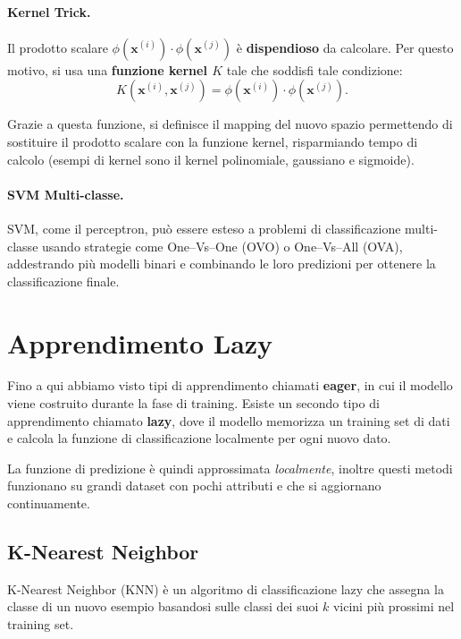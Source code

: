 \paragraph{Kernel Trick.} Il prodotto scalare \(\phi(\mathbf{x}^{(i)})\cdot\phi(\mathbf{x}^{(j)})\) è \textbf{dispendioso} da calcolare. Per questo motivo, si usa una \textbf{funzione kernel $K$} tale che soddisfi tale condizione:
\[
K(\mathbf{x}^{(i)},\mathbf{x}^{(j)}) = \phi(\mathbf{x}^{(i)})\cdot\phi(\mathbf{x}^{(j)}).
\]

Grazie a questa funzione, si definisce il mapping del nuovo spazio permettendo di sostituire il prodotto scalare con la funzione kernel, risparmiando tempo di calcolo (esempi di kernel sono il kernel polinomiale, gaussiano e sigmoide).

\paragraph{SVM Multi-classe.} SVM, come il perceptron, può essere esteso a problemi di classificazione multi-classe usando strategie come One–Vs–One (OVO) o One–Vs–All (OVA), addestrando più modelli binari e combinando le loro predizioni per ottenere la classificazione finale.

\section{Apprendimento Lazy}
Fino a qui abbiamo visto tipi di apprendimento chiamati \textbf{eager}, in cui il modello viene costruito durante la fase di training.  Esiste un secondo tipo di apprendimento chiamato \textbf{lazy}, dove il modello memorizza un training set di dati e calcola la funzione di classificazione localmente per ogni nuovo dato.

La funzione di predizione è quindi approssimata \emph{localmente}, inoltre questi metodi funzionano su grandi dataset con pochi attributi e che si aggiornano continuamente.

\subsection{K-Nearest Neighbor}\label{subsec:knn}
K-Nearest Neighbor (KNN) è un algoritmo di classificazione lazy che assegna la classe di un nuovo esempio basandosi sulle classi dei suoi \(k\) vicini più prossimi nel training set.

